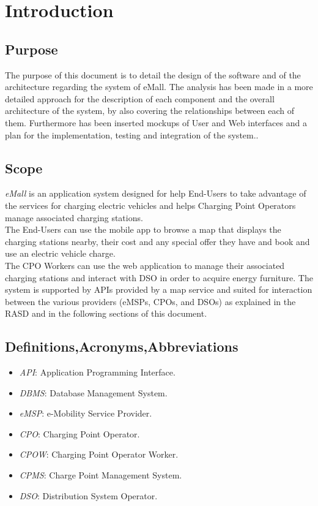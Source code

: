 \documentclass[a4paper]{report}
\begin{document}
\tableofcontents
\listoffigures
\begingroup
\let\clearpage\relax %
\listoftables
\endgroup
\restoregeometry

\chapter{Introduction}
\section{Purpose}

The purpose of this document is to detail the design of the software and of the architecture regarding the system of
eMall. The analysis has been made in a more detailed approach for the description of each component
and the overall architecture of the system, by also covering the relationships between each of them. Furthermore has been inserted mockups of User and Web interfaces and a plan for the implementation,
testing and integration of the system..

\section{Scope}
\textit{eMall} is an application system designed for help End-Users to take advantage of the services for charging electric vehicles and helps Charging Point Operators manage associated charging
stations.\\
The End-Users can use the mobile app to browse a map that displays the charging stations nearby, their cost and any special offer they have and book and use an electric vehicle charge.\\
The CPO Workers can use the web application to manage their associated charging stations and interact with DSO in order to acquire energy furniture. The system is supported by APIs provided by a map service and suited for interaction between the various providers (eMSPs, CPOs, and DSOs) as explained in the RASD and in the following sections of this document.
\section{Definitions,Acronyms,Abbreviations}
\begin{itemize}
\item \textit{API}: Application Programming Interface.
\item \textit{DBMS}: Database Management System.
\item \textit{eMSP}: e-Mobility Service Provider.
\item \textit{CPO}: Charging Point Operator.
\item \textit{CPOW}: Charging Point Operator Worker.
\item \textit{CPMS}: Charge Point Management System.
\item \textit{DSO}: Distribution System Operator.
\end{itemize}
\end{document}
